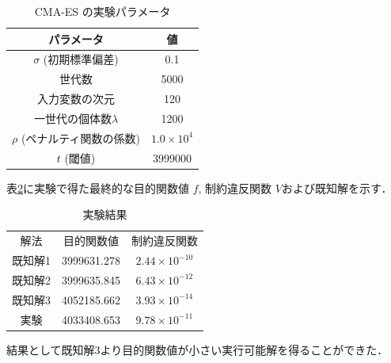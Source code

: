 \documentclass[twocolumn]{jarticle}
\begin{document}
\begin{table}[htbp]
    \begin{center}
        \caption{CMA-ES の実験パラメータ}
        \label{setting_cmaes}
        \begin{tabular}{| c | c |} 
            \hline
            パラメータ & 値 \\ 
            \hline
            $\sigma$ (初期標準偏差) &  0.1 \\
            世代数 & 5000 \\
            入力変数の次元 & 120 \\
            一世代の個体数$\lambda$ & 1200 \\
            $\rho$ (ペナルティ関数の係数) & $1.0\times10^{4}$\\
            $t$ (閾値) & 3999000 \\
            \hline
        \end{tabular}
    \end{center}
\end{table}

表\ref{result}に実験で得た最終的な目的関数値 $f$, 制約違反関数 $V$および既知解を示す．
\begin{table}[htbp]
    \begin{center}
        \caption{実験結果}
        \label{result}
        \begin{tabular}{|c|c|c|}
            \hline
            解法 & 目的関数値 & 制約違反関数 \\ 
            既知解1 & 3999631.278 & $2.44 \times 10^{-10}$ \\
            既知解2 & 3999635.845 & $6.43 \times 10^{-12}$ \\
            既知解3 & 4052185.662 & $3.93 \times 10^{-14}$ \\
            実験    & 4033408.653 & $9.78 \times 10^{-11}$ \\
            \hline
        \end{tabular}
    \end{center}
\end{table}
結果として既知解3より目的関数値が小さい実行可能解を得ることができた．
\end{document}
